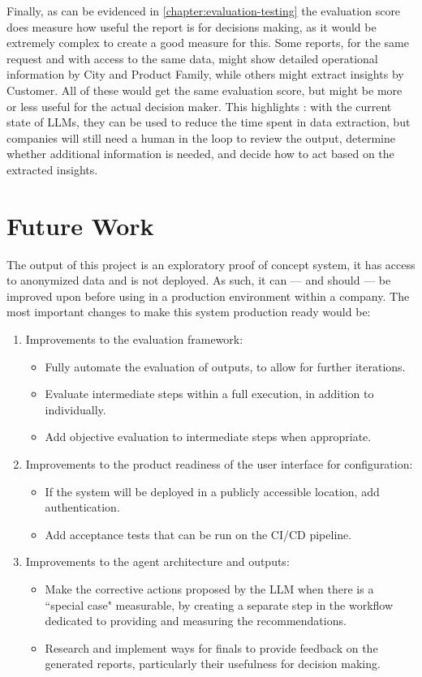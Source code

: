 \documentclass[a4paper]{report}
\begin{document}
Finally, as can be evidenced in \autoref{chapter:evaluation-testing} the evaluation score does measure how useful the report is for decisions making, as it would be extremely complex to create a good measure for this. Some reports, for the same request and with access to the same data, might show detailed operational information by City and Product Family, while others might extract insights by Customer. All of these would get the same evaluation score, but might be more or less useful for the actual decision maker. This highlights \kfid : with the current state of LLMs, they can be used to reduce the time spent in data extraction, but companies will still need a human in the loop to review the output, determine whether additional information is needed, and decide how to act based on the extracted insights.

\section{Future Work}
\label{sec:future-work}

The output of this project is an exploratory proof of concept system, it has access to anonymized data and is not deployed. As such, it can --- and should --- be improved upon before using in a production environment within a company. The most important changes to make this system production ready would be:

\begin{enumerate}
    \item Improvements to the evaluation framework:
    \begin{itemize}
        \item Fully automate the evaluation of outputs, to allow for further iterations.
        \item Evaluate intermediate steps within a full execution, in addition to individually.
        \item Add objective evaluation to intermediate steps when appropriate.
    \end{itemize}
    \item Improvements to the product readiness of the user interface for configuration:
    \begin{itemize}
        \item If the system will be deployed in a publicly accessible location, add authentication.
        \item Add acceptance tests that can be run on the CI/CD pipeline.
    \end{itemize}
    \item Improvements to the agent architecture and outputs:
    \begin{itemize}
        \item Make the corrective actions proposed by the LLM when there is a ``special case" measurable, by creating a separate step in the workflow dedicated to providing and measuring the recommendations.
        \item Research and implement ways for finals to provide feedback on the generated reports, particularly their usefulness for decision making.
    \end{itemize}
\end{enumerate}
\end{document}
